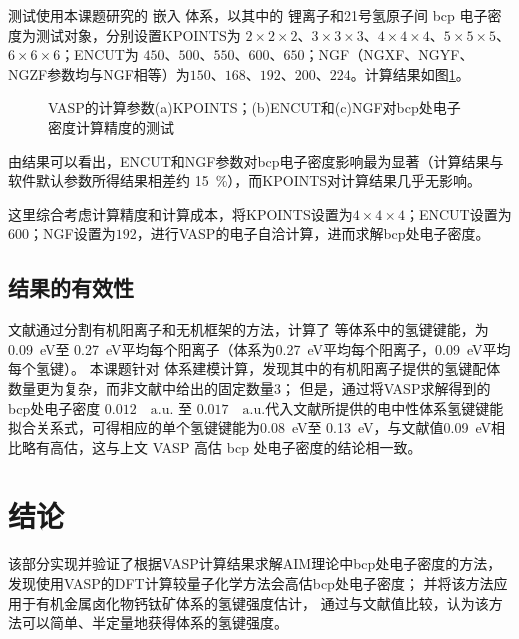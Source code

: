 测试使用本课题研究的 嵌入 体系，以其中的 锂离子和21号氢原子间 bcp 电子密度为测试对象，分别设置KPOINTS为 $2 \times 2 \times 2$、$3 \times 3 \times 3$、$4 \times 4 \times 4$、$5 \times 5 \times 5$、$6 \times 6 \times 6$；ENCUT为 $450$、$500$、$550$、$600$、$650$；NGF（NGXF、NGYF、NGZF参数均与NGF相等）为$150$、$168$、$192$、$200$、$224$。计算结果如图\ref{fig:bcp-test2}。

\begin{figure}[htbp]
    \centering
    \caption{VASP的计算参数(a)KPOINTS；(b)ENCUT和(c)NGF对bcp处电子密度计算精度的测试}
    \label{fig:bcp-test2}
\end{figure}


由结果可以看出，ENCUT和NGF参数对bcp电子密度影响最为显著（计算结果与软件默认参数所得结果相差约 \SI{15}{\percent}），而KPOINTS对计算结果几乎无影响。

这里综合考虑计算精度和计算成本，将KPOINTS设置为$4 \times 4 \times 4$；ENCUT设置为$600$；NGF设置为$192$，进行VASP的电子自洽计算，进而求解bcp处电子密度。

\subsection{结果的有效性}

文献\cite{svaneHowStrongHydrogen2017}通过分割有机阳离子和无机框架的方法，计算了  等体系中的氢键键能，为 \SI{0.09}{eV}至 \SI{0.27}{eV}平均每个阳离子（体系为\SI{0.27}{eV}平均每个阳离子，\SI{0.09}{eV}平均每个氢键）。
本课题针对  体系建模计算，发现其中的有机阳离子提供的氢键配体数量更为复杂，而非文献\cite{svaneHowStrongHydrogen2017}中给出的固定数量3；
但是，通过将VASP求解得到的 bcp处电子密度 $0.012 \quad \mathrm{a.u.}$ 至 $0.017 \quad \mathrm{a.u.}$代入文献\cite{emamianExploringNaturePredicting2019}所提供的电中性体系氢键键能拟合关系式，可得相应的单个氢键键能为\SI{0.08}{eV}至 \SI{0.13}{eV}，与文献值\cite{svaneHowStrongHydrogen2017}\SI{0.09}{eV}相比略有高估，这与上文 VASP 高估 bcp 处电子密度的结论相一致。

\section{结论}

该部分实现并验证了根据VASP计算结果求解AIM理论中bcp处电子密度的方法，
发现使用VASP的DFT计算较量子化学方法会高估bcp处电子密度；
并将该方法应用于有机金属卤化物钙钛矿体系的氢键强度估计，
通过与文献值比较，认为该方法可以简单、半定量地获得体系的氢键强度。
